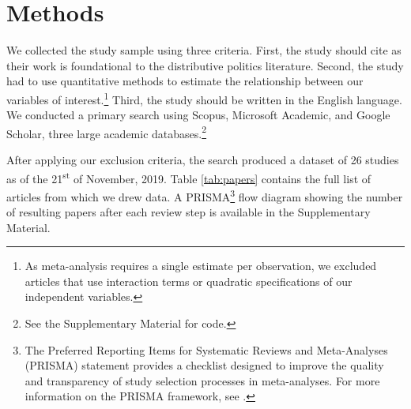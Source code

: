 \documentclass[a4paper,12pt]{article}
\begin{document}
\section{Methods}

We collected the study sample using three criteria. First, the study should cite
\citet{weingast1981political} as their work is foundational to the distributive
politics literature. Second, the study had to use quantitative methods to
estimate the relationship between our variables of interest.\footnote{As
meta-analysis requires a single estimate per observation, we excluded articles
that use interaction terms or quadratic specifications of our independent
variables.} Third, the study should be written in the English language. We
conducted a primary search using Scopus, Microsoft Academic, and Google Scholar,
three large academic databases.\footnote{See the Supplementary Material for code.}

After applying our exclusion criteria, the search produced a dataset of 26
studies as of the 21\textsuperscript{st} of November, 2019. Table
\ref{tab:papers} contains the full list of articles from which we drew data. A
PRISMA\footnote{The Preferred Reporting Items for Systematic Reviews and
  Meta-Analyses (PRISMA) statement provides a checklist designed to improve the
quality and transparency of study selection processes in meta-analyses. For more
information on the PRISMA framework, see \citet{liberati2009prisma}.} flow
diagram showing the number of resulting papers after each review step is
available in the Supplementary Material.
\end{document}
